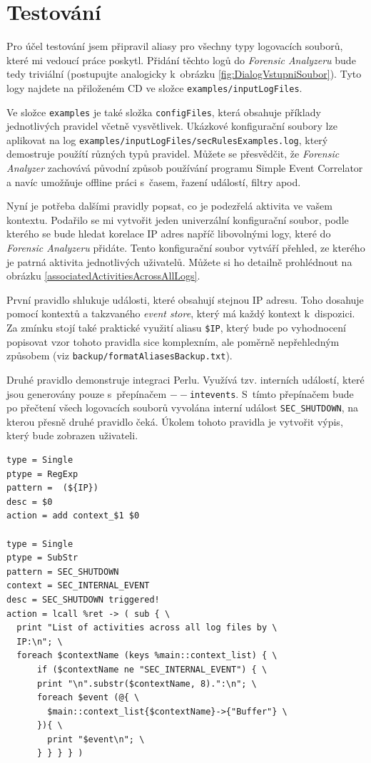 \documentclass[thesis=B,czech]{FITthesis}[2012/06/26]
\begin{document}
\chapter{Testování}
Pro účel testování jsem připravil aliasy pro všechny typy logovacích souborů, které mi vedoucí práce poskytl. Přidání těchto logů do \textit{Forensic Analyzeru} bude tedy triviální (postupujte analogicky k~obrázku \ref{fig:DialogVstupniSoubor}). Tyto logy najdete na přiloženém CD ve složce \texttt{examples/inputLogFiles}. 

Ve složce \texttt{examples} je také složka \texttt{configFiles}, která obsahuje příklady jednotlivých pravidel včetně vysvětlivek. Ukázkové konfigurační soubory lze aplikovat na log \texttt{examples/inputLogFiles/secRulesExamples.log}, který demostruje použítí různých typů pravidel. Můžete se přesvědčit, že \textit{Forensic Analyzer} zachovává původní způsob používání programu Simple Event Correlator a navíc umožňuje offline práci s~časem, řazení událostí, filtry apod.

Nyní je potřeba dalšími pravidly popsat, co je podezřelá aktivita ve vašem kontextu. Podařilo se mi vytvořit jeden univerzální konfigurační soubor, podle kterého se bude hledat korelace IP adres napříč libovolnými logy, které do \textit{Forensic Analyzeru} přidáte. Tento konfigurační soubor vytváří přehled, ze kterého je patrná aktivita jednotlivých uživatelů. Můžete si ho detailně prohlédnout na obrázku \ref{associatedActivitiesAcrossAllLogs}.


První pravidlo shlukuje události, které obsahují stejnou IP adresu. Toho dosahuje pomocí kontextů a takzvaného \textit{event store}, který má každý kontext k~dispozici. Za zmínku stojí také praktické využití aliasu \texttt{\${IP}}, který bude po vyhodnocení popisovat vzor tohoto pravidla sice komplexním, ale poměrně nepřehledným způsobem (viz \texttt{backup/formatAliasesBackup.txt}).

Druhé pravidlo demonstruje integraci Perlu. Využívá tzv. interních událostí, které jsou generovány pouze s~přepínačem \texttt{$--$intevents}. S~tímto přepínačem bude po přečtení všech logovacích souborů vyvolána interní událost \texttt{SEC\_SHUTDOWN}, na kterou přesně druhé pravidlo čeká. Úkolem tohoto pravidla je vytvořit výpis, který bude zobrazen uživateli.

\begin{lstlisting}[frame=single,caption=Konfig. soubor  \texttt{associatedActivitiesAcrossAllLogs.conf},label=associatedActivitiesAcrossAllLogs]
type = Single
ptype = RegExp
pattern =  (${IP})
desc = $0
action = add context_$1 $0

type = Single
ptype = SubStr
pattern = SEC_SHUTDOWN
context = SEC_INTERNAL_EVENT
desc = SEC_SHUTDOWN triggered!
action = lcall %ret -> ( sub { \
  print "List of activities across all log files by \
  IP:\n"; \
  foreach $contextName (keys %main::context_list) { \
      if ($contextName ne "SEC_INTERNAL_EVENT") { \
      print "\n".substr($contextName, 8).":\n"; \
      foreach $event (@{ \
      	$main::context_list{$contextName}->{"Buffer"} \ 
      }){ \
        print "$event\n"; \
      } } } } )
\end{lstlisting}
\end{document}
